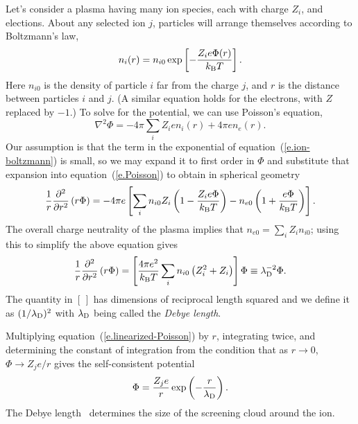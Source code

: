 Let's consider a plasma having many ion species, each with charge $Z_{i}$, and elections. About any selected ion $j$,  particles will arrange themselves according to Boltzmann's law,
\begin{equation}\label{e.ion-boltzmann}
n_{i}(r) = n_{i0}\exp\left[-\frac{Z_{i}e\Phi(r)}{k_\mathrm{B} T}\right].
\end{equation}
Here $n_{i0}$ is the density of particle $i$ far from the charge $j$, and $r$ is the distance between particles $i$ and $j$.  (A similar equation holds for the electrons, with $Z$ replaced by $-1$.) To solve for the potential, we can use Poisson's equation,
\begin{equation}\label{e.Poisson}
\nabla^{2}\Phi = -4\pi \sum_{i} Z_{i}e n_{i}(r) +4\pi e n_{e}(r).
\end{equation}
Our assumption is that the term in the exponential of equation~(\ref{e.ion-boltzmann}) is small, so we may expand it to first order in $\Phi$ and substitute that expansion into equation~(\ref{e.Poisson}) to obtain in spherical geometry
\[
 \frac{1}{r}\frac{\partial^{2}}{\partial r^{2}}\left(r\Phi\right) = -4\pi e \left[\sum_{i} n_{i0}Z_{i}\left(1-\frac{Z_{i}e\Phi}{k_\mathrm{B} T}\right) - n_{e0}\left(1 + \frac{e\Phi}{k_\mathrm{B} T}\right)\right].
\]
The overall charge neutrality of the plasma implies that $n_{e0} = \sum_{i}Z_{i}n_{i0}$; using this to simplify the above equation gives
\begin{equation}\label{e.linearized-Poisson}
\frac{1}{r}\frac{\partial^{2}}{\partial r^{2}}\left(r\Phi\right) = \left[\frac{4\pi e^{2}}{k_\mathrm{B} T}\sum_{i} n_{i0}\left(Z_{i}^{2}+Z_{i}\right)\right]\Phi \equiv \lambda_{\mathrm{D}}^{-2}\Phi.
\end{equation}
The quantity in $[\, ]$ has dimensions of reciprocal length squared and we define it as $(1/\lambda_{\mathrm{D}})^{2}$ with $\lambda_{\mathrm{D}}$ being called the \emph{Debye length}.

Multiplying equation~(\ref{e.linearized-Poisson}) by $r$, integrating twice, and determining the constant of integration from the condition that as $r\to 0$, $\Phi \to Z_{j}e/r$ gives the self-consistent potential
\begin{equation}\label{e.screened-potential}
\Phi = \frac{Z_{j}e}{r}\exp\left(-\frac{r}{\lambda_{\mathrm{D}}}\right).
\end{equation}
The Debye length \lambdaD\ determines the size of the screening cloud around the ion.

